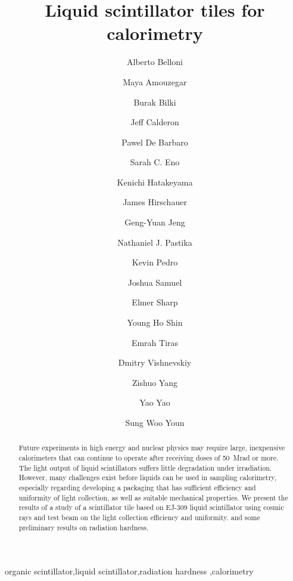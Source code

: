 \documentclass[review]{elsarticle}
\begin{document}
\begin{frontmatter}

\title{Liquid scintillator tiles for calorimetry}


\author[umd]{Alberto Belloni}
\author[umd]{Maya Amouzegar}
\author[iowa]{Burak Bilki}
\author[umd]{Jeff Calderon}
\author[rochester]{Pawel De Barbaro}
\author[umd]{Sarah C. Eno}
\author[baylor]{Kenichi Hatakeyama}
\author[fnal]{James Hirschauer}
\author[umd]{Geng-Yuan Jeng}
\author[baylor]{Nathaniel J. Pastika}
\author[fnal]{Kevin Pedro}
\author[umd]{Joshua Samuel}
\author[elmer]{Elmer Sharp}
\author[umd]{Young Ho Shin}
\author[baylor]{Emrah Tiras}
\author[rochester]{Dmitry Vishnevskiy}
\author[umd]{Zishuo Yang}
\author[umd]{Yao Yao}
\author[korea]{Sung Woo Youn}




\address[umd]{Dept. Physics, U. Maryland, College Park, MD, USA}
\address[korea]{Dept. Physics, Institute for Basic Science, Center for Axion and Precision Physics Research, Yuseong-gu, Daejeon 305-701, South Korea}
\address[elmer]{Elmer Sharp Engineering, 7007 Leesville Blvd. Springfield, VA 22151}
\address[fnal]{Fermi National Accelerator Laboratory, Batavia, IL, USA}
\address[baylor]{Dept. Physics, Baylor University, Waco, Texas, USA}
\address[iowa]{Dept. Physics, The University of Iowa, Iowa City, IA, USA}
\address[rochester]{Dept. Physics, The University of Rochester, Rochester, NY, USA}

\begin{abstract}
Future experiments in high energy and nuclear physics may require
large, inexpensive calorimeters that can continue to
operate after receiving doses of 50~Mrad
or more. The light output of liquid scintillators suffers little
degradation under irradiation.  However, many challenges exist
before  liquids can be used in sampling calorimetry,
especially regarding developing
a packaging that has sufficient efficiency and uniformity of light collection,
as well as
suitable mechanical properties.
We present the results of a study of a scintillator tile
based on EJ-309 liquid scintillator using cosmic rays and test beam
on the light collection efficiency and uniformity. and some preliminary results
on radiation hardness.
\end{abstract}

\begin{keyword}
organic scintillator\sep liquid scintillator\sep radiation
hardness \sep calorimetry
\end{keyword}

\end{frontmatter}
\end{document}
